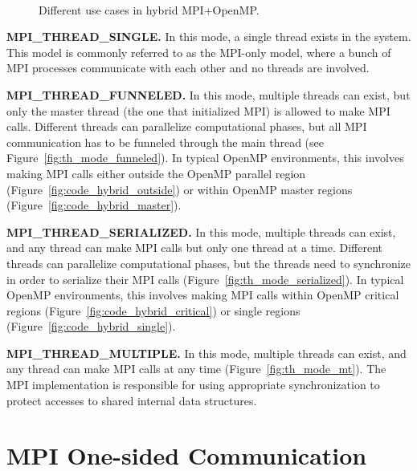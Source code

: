 \begin{figure}%
\vspace{-1ex}
\setlength{\subfigcapskip}{5pt}
\centering
{}
\hfill
{}
\\
\hfill
{}
\vspace{-2.0ex}
\caption{Different use cases in hybrid MPI+OpenMP.}
\vspace{-2.5ex}
\label{fig:code_omp}
\end{figure}

\vspace{1.0ex}
\noindent\textbf{MPI\_THREAD\_SINGLE.}  In this mode, a single thread
exists in the system.  This model is commonly referred to as the
MPI-only model, where a bunch of MPI processes communicate with each
other and no threads are involved.

\vspace{1.0ex}
\noindent\textbf{MPI\_THREAD\_FUNNELED.}  In this mode, multiple
th\-reads can exist, but only the master thread (the one that
initialized MPI) is allowed to make MPI calls.  Different threads can
parallelize computational phases, but all MPI communication has to be
funneled through the main thread (see
Figure~\ref{fig:th_mode_funneled}).  In typical OpenMP environments,
this involves making MPI calls either outside the OpenMP parallel
region (Figure~\ref{fig:code_hybrid_outside}) or within OpenMP master
regions (Figure~\ref{fig:code_hybrid_master}).

\vspace{1.0ex}
\noindent\textbf{MPI\_THREAD\_SERIALIZED.}  In this mode, multiple
threads can exist, and any thread can make MPI calls but only one
thread at a time.  Different threads can parallelize computational
phases, but the threads need to synchronize in order to serialize
their MPI calls (Figure~\ref{fig:th_mode_serialized}).  In typical
OpenMP environments, this involves making MPI calls within OpenMP
critical regions (Figure~\ref{fig:code_hybrid_critical}) or single
regions (Figure~\ref{fig:code_hybrid_single}).

\vspace{1.0ex}
\noindent\textbf{MPI\_THREAD\_MULTIPLE.}  In this mode, multiple
thr\-eads can exist, and any thread can make MPI calls at any time
(Figure~\ref{fig:th_mode_mt}).  The MPI implementation is responsible
for using appropriate synchronization to protect accesses to shared
internal data structures.
\vspace{1.0ex}

\section{MPI One-sided Communication}\label{sec:back-rma}
